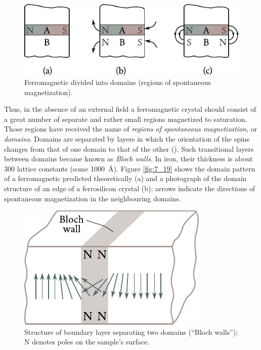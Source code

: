 \begin{figure}[t]
	\begin{center}
		\includegraphics[scale=1]{figures/ch_07/fig_7_17.pdf}
		\caption[]{Ferromagnetic divided into domains (regions of spontaneous magnetization).}
		\label{fig:7_17}
	\end{center}
	\vspace{-0.8cm}
\end{figure}

Thus, in the absence of an external field a ferromagnetic crystal should consist of a great number of separate and rather small regions magnetized to saturation. Those regions have received the name of \textit{regions of spontaneous magnetization}, or \textit{domains}. Domains are separated by layers in which the orientation of the spins changes from that of one domain to that of the other (). Such transitional layers between domains became known as \textit{Bloch walls}. In iron, their thickness is about $300$ lattice constants (some \SI{1000}{\angstrom}). Figure \ref{fig:7_19} shows the domain pattern of a ferromagnetic predicted theoretically (a) and a photograph of the domain structure of an edge of a ferrosilicon crystal (b); arrows indicate the directions of spontaneous magnetization in the neighbouring domains.

\begin{figure}[t]
	\begin{center}
		\includegraphics[scale=1]{figures/ch_07/fig_7_18.pdf}
		\caption[]{Structure of boundary layer separating two domains (``Bloch walls''); N denotes poles on the sample's surface.}
		\label{fig:7_18}
	\end{center}
	\vspace{-0.7cm}
\end{figure}

